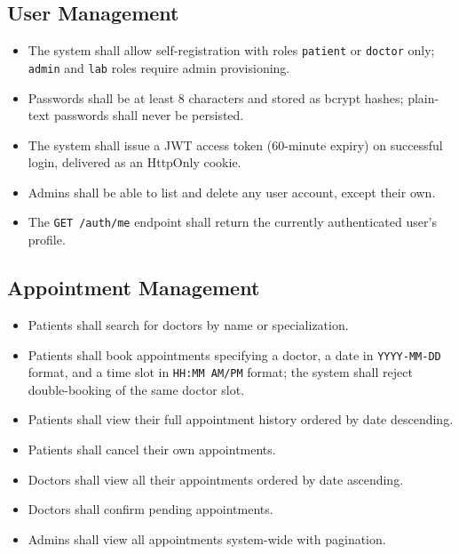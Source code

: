 \documentclass[a4paper,12pt]{report}
\begin{document}
\subsection{User Management}
\begin{itemize}
    \item The system shall allow self-registration with roles \texttt{patient} or \texttt{doctor} only; \texttt{admin} and \texttt{lab} roles require admin provisioning.
    \item Passwords shall be at least 8 characters and stored as bcrypt hashes; plain-text passwords shall never be persisted.
    \item The system shall issue a JWT access token (60-minute expiry) on successful login, delivered as an HttpOnly cookie.
    \item Admins shall be able to list and delete any user account, except their own.
    \item The \texttt{GET /auth/me} endpoint shall return the currently authenticated user's profile.
\end{itemize}

\subsection{Appointment Management}
\begin{itemize}
    \item Patients shall search for doctors by name or specialization.
    \item Patients shall book appointments specifying a doctor, a date in \texttt{YYYY-MM-DD} format, and a time slot in \texttt{HH:MM AM/PM} format; the system shall reject double-booking of the same doctor slot.
    \item Patients shall view their full appointment history ordered by date descending.
    \item Patients shall cancel their own appointments.
    \item Doctors shall view all their appointments ordered by date ascending.
    \item Doctors shall confirm pending appointments.
    \item Admins shall view all appointments system-wide with pagination.
\end{itemize}
\end{document}
